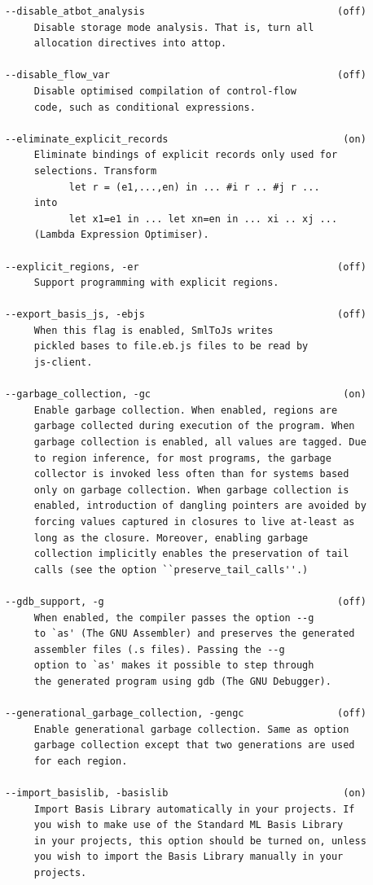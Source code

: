 \documentclass[12pt]{book}
\begin{document}
\begin{verbatim}
--disable_atbot_analysis                                 (off)
     Disable storage mode analysis. That is, turn all
     allocation directives into attop.

--disable_flow_var                                       (off)
     Disable optimised compilation of control-flow
     code, such as conditional expressions.

--eliminate_explicit_records                              (on)
     Eliminate bindings of explicit records only used for
     selections. Transform
           let r = (e1,...,en) in ... #i r .. #j r ...
     into
           let x1=e1 in ... let xn=en in ... xi .. xj ...
     (Lambda Expression Optimiser).

--explicit_regions, -er                                  (off)
     Support programming with explicit regions.

--export_basis_js, -ebjs                                 (off)
     When this flag is enabled, SmlToJs writes
     pickled bases to file.eb.js files to be read by
     js-client.

--garbage_collection, -gc                                 (on)
     Enable garbage collection. When enabled, regions are
     garbage collected during execution of the program. When
     garbage collection is enabled, all values are tagged. Due
     to region inference, for most programs, the garbage
     collector is invoked less often than for systems based
     only on garbage collection. When garbage collection is
     enabled, introduction of dangling pointers are avoided by
     forcing values captured in closures to live at-least as
     long as the closure. Moreover, enabling garbage
     collection implicitly enables the preservation of tail
     calls (see the option ``preserve_tail_calls''.)

--gdb_support, -g                                        (off)
     When enabled, the compiler passes the option --g
     to `as' (The GNU Assembler) and preserves the generated
     assembler files (.s files). Passing the --g
     option to `as' makes it possible to step through
     the generated program using gdb (The GNU Debugger).

--generational_garbage_collection, -gengc                (off)
     Enable generational garbage collection. Same as option
     garbage collection except that two generations are used
     for each region.

--import_basislib, -basislib                              (on)
     Import Basis Library automatically in your projects. If
     you wish to make use of the Standard ML Basis Library
     in your projects, this option should be turned on, unless
     you wish to import the Basis Library manually in your
     projects.


\end{verbatim}
\end{document}

